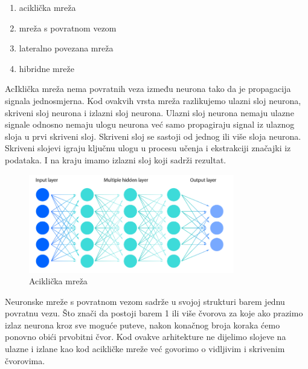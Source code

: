 \begin{enumerate}
    \item aciklička mreža
    \item mreža s povratnom vezom
    \item lateralno povezana mreža
    \item hibridne mreže
\end{enumerate}

AcIklička mreža nema povratnih veza između neurona tako da je propagacija signala jednosmjerna.
Kod ovakvih vrsta mreža razlikujemo ulazni sloj neurona, skriveni sloj neurona i izlazni sloj neurona.
Ulazni sloj neurona nemaju ulazne signale odnosno nemaju ulogu neurona već samo propagiraju signal iz ulaznog sloja u prvi skriveni sloj.
Skriveni sloj se sastoji od jednog ili više sloja neurona. Skriveni slojevi igraju ključnu ulogu u procesu učenja i ekstrakciji značajki iz podataka.
I na kraju imamo izlazni sloj koji sadrži rezultat.
\FloatBarrier
\begin{figure}[h]
    \centering
    \includegraphics[width=0.8\textwidth]{images/nn-arch}
    \caption{Aciklička mreža}
    \label{fig:slika4}
\end{figure}
\FloatBarrier

Neuronske mreže s povratnom vezom sadrže u svojoj strukturi barem jednu povratnu vezu.
Što znači da postoji barem 1 ili više čvorova za koje ako prazimo izlaz neurona kroz sve moguće puteve, nakon konačnog broja koraka ćemo ponovno obići prvobitni čvor.
Kod ovakve arhitekture ne dijelimo slojeve na ulazne i izlane kao kod acikličke mreže već govorimo o vidljivim i skrivenim čvorovima.

